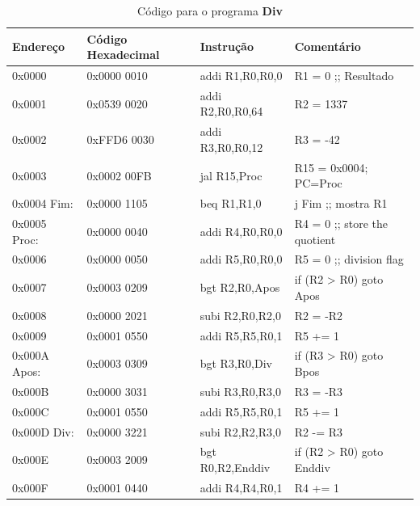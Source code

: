 \documentclass[12pt]{article}
\begin{document}
\begin{table}[H]
    \centering
    \caption{Código para o programa \textbf{Div}}
    \begin{tabular}{|l|l|l|l|}\hline
        \textbf{Endereço} & \textbf{Código Hexadecimal} & \textbf{Instrução} & \textbf{Comentário} \\\hline
        0x0000         & 0x0000 0010 & addi R1,R0,R0,0      & R1 = 0 ;; Resultado          \\\hline
        0x0001         & 0x0539 0020 & addi R2,R0,R0,64     & R2 = 1337                    \\\hline
        0x0002         & 0xFFD6 0030 & addi R3,R0,R0,12     & R3 = -42                     \\\hline
        0x0003         & 0x0002 00FB & jal  R15,Proc        & R15 = 0x0004; PC=Proc        \\\hline
        0x0004 Fim:    & 0x0000 1105 & beq  R1,R1,0         & j Fim ;; mostra R1           \\\hline
        0x0005 Proc:   & 0x0000 0040 & addi R4,R0,R0,0      & R4 = 0 ;; store the quotient \\\hline
        0x0006         & 0x0000 0050 & addi R5,R0,R0,0      & R5 = 0 ;; division flag      \\\hline
        0x0007         & 0x0003 0209 & bgt  R2,R0,Apos      & if (R2 > R0) goto Apos       \\\hline
        0x0008         & 0x0000 2021 & subi R2,R0,R2,0      & R2 = -R2                     \\\hline
        0x0009         & 0x0001 0550 & addi R5,R5,R0,1      & R5 += 1                      \\\hline
        0x000A Apos:   & 0x0003 0309 & bgt  R3,R0,Div       & if (R3 > R0) goto Bpos       \\\hline
        0x000B         & 0x0000 3031 & subi R3,R0,R3,0      & R3 = -R3                     \\\hline
        0x000C         & 0x0001 0550 & addi R5,R5,R0,1      & R5 += 1                      \\\hline
        0x000D Div:    & 0x0000 3221 & subi R2,R2,R3,0      & R2 -= R3                     \\\hline
        0x000E         & 0x0003 2009 & bgt  R0,R2,Enddiv    & if (R2 > R0) goto Enddiv     \\\hline
        0x000F         & 0x0001 0440 & addi R4,R4,R0,1      & R4 += 1                      \\\hline

\end{tabular}
\end{table}
\end{document}
